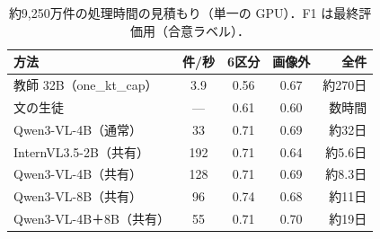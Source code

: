 \begin{table}[t]
    \centering
    \caption{約9,250万件の処理時間の見積もり（単一の GPU）．F1 は最終評価用（合意ラベル）．}
    \label{tab_time}
    \footnotesize
    \setlength{\tabcolsep}{2.5pt}
    \begin{tabular}{@{}lcccr@{}}
        \toprule
        方法 & 件/秒 & 6区分 & 画像外 & 全件 \\
        \midrule
        教師 32B（one\_kt\_cap） & 3.9 & 0.56 & 0.67 & 約270日 \\
        文の生徒 & --- & 0.61 & 0.60 & 数時間 \\
        Qwen3-VL-4B（通常） & 33 & 0.71 & 0.69 & 約32日 \\
        InternVL3.5-2B（共有） & 192 & 0.71 & 0.64 & 約5.6日 \\
        Qwen3-VL-4B（共有） & 128 & 0.71 & 0.69 & 約8.3日 \\
        Qwen3-VL-8B（共有） & 96 & 0.74 & 0.68 & 約11日 \\
        Qwen3-VL-4B＋8B（共有） & 55 & 0.71 & 0.70 & 約19日 \\
        \bottomrule
    \end{tabular}
\end{table}
